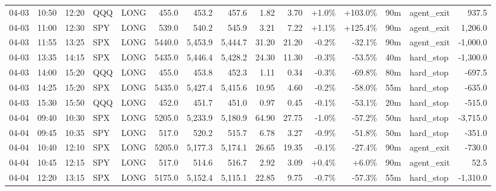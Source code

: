 \documentclass[11pt,a4paper,twoside]{article}
\begin{document}
\begin{landscape}
\begin{center}
\begin{longtable}{>{\color{txtmain}}l l l l l r r r r r r r r >{\color{txtmain}}l r}
04-03 & 10:50 & 12:20 & QQQ & LONG & 455.0 & 453.2 & 457.6 & 1.82 & 3.70 & \textcolor{wingreen}{+1.0\%} & \textcolor{wingreen}{+103.0\%} & 90m & agent\_exit & \textcolor{wingreen}{937.5} \\
04-03 & 11:00 & 12:30 & SPY & LONG & 539.0 & 540.2 & 545.9 & 3.21 & 7.22 & \textcolor{wingreen}{+1.1\%} & \textcolor{wingreen}{+125.4\%} & 90m & agent\_exit & \textcolor{wingreen}{1,206.0} \\
04-03 & 11:55 & 13:25 & SPX & LONG & 5440.0 & 5,453.9 & 5,444.7 & 31.20 & 21.20 & \textcolor{lossred}{-0.2\%} & \textcolor{lossred}{-32.1\%} & 90m & agent\_exit & \textcolor{lossred}{-1,000.0} \\
04-03 & 13:35 & 14:15 & SPX & LONG & 5435.0 & 5,446.4 & 5,428.2 & 24.30 & 11.30 & \textcolor{lossred}{-0.3\%} & \textcolor{lossred}{-53.5\%} & 40m & hard\_stop & \textcolor{lossred}{-1,300.0} \\
04-03 & 14:00 & 15:20 & QQQ & LONG & 455.0 & 453.8 & 452.3 & 1.11 & 0.34 & \textcolor{lossred}{-0.3\%} & \textcolor{lossred}{-69.8\%} & 80m & hard\_stop & \textcolor{lossred}{-697.5} \\
04-03 & 14:25 & 15:20 & SPX & LONG & 5435.0 & 5,427.4 & 5,415.6 & 10.95 & 4.60 & \textcolor{lossred}{-0.2\%} & \textcolor{lossred}{-58.0\%} & 55m & hard\_stop & \textcolor{lossred}{-635.0} \\
04-03 & 15:30 & 15:50 & QQQ & LONG & 452.0 & 451.7 & 451.0 & 0.97 & 0.45 & \textcolor{lossred}{-0.1\%} & \textcolor{lossred}{-53.1\%} & 20m & hard\_stop & \textcolor{lossred}{-515.0} \\
04-04 & 09:40 & 10:30 & SPX & LONG & 5205.0 & 5,233.9 & 5,180.9 & 64.90 & 27.75 & \textcolor{lossred}{-1.0\%} & \textcolor{lossred}{-57.2\%} & 50m & hard\_stop & \textcolor{lossred}{-3,715.0} \\
04-04 & 09:45 & 10:35 & SPY & LONG & 517.0 & 520.2 & 515.7 & 6.78 & 3.27 & \textcolor{lossred}{-0.9\%} & \textcolor{lossred}{-51.8\%} & 50m & hard\_stop & \textcolor{lossred}{-351.0} \\
04-04 & 10:40 & 12:10 & SPX & LONG & 5205.0 & 5,177.3 & 5,174.1 & 26.65 & 19.35 & \textcolor{lossred}{-0.1\%} & \textcolor{lossred}{-27.4\%} & 90m & agent\_exit & \textcolor{lossred}{-730.0} \\
04-04 & 10:45 & 12:15 & SPY & LONG & 517.0 & 514.6 & 516.7 & 2.92 & 3.09 & \textcolor{wingreen}{+0.4\%} & \textcolor{wingreen}{+6.0\%} & 90m & agent\_exit & \textcolor{wingreen}{52.5} \\
04-04 & 12:20 & 13:15 & SPX & LONG & 5175.0 & 5,152.4 & 5,115.1 & 22.85 & 9.75 & \textcolor{lossred}{-0.7\%} & \textcolor{lossred}{-57.3\%} & 55m & hard\_stop & \textcolor{lossred}{-1,310.0} \\

\end{longtable}
\end{center}
\end{landscape}
\end{document}
